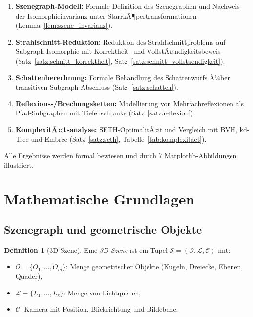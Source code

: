 ﻿\documentclass[a4paper,12pt]{article}
\theoremstyle{definition}
\newtheorem{definition}{Definition}[section]
\begin{document}
\begin{enumerate}
  \item \textbf{Szenegraph-Modell:} Formale Definition des Szenegraphen
        und Nachweis der Isomorphieinvarianz unter
        StarrkÃ¶pertransformationen
        (Lemma~\ref{lem:szene_invarianz}).
  \item \textbf{Strahlschnitt-Reduktion:} Reduktion des
        Strahlschnittproblems auf Subgraph-Isomorphie mit Korrektheit-
        und VollstÃ¤ndigkeitsbeweis
        (Satz~\ref{satz:schnitt_korrektheit},
        Satz~\ref{satz:schnitt_vollstaendigkeit}).
  \item \textbf{Schattenberechnung:} Formale Behandlung des
        Schattenwurfs Ã¼ber transitiven Subgraph-Abschluss
        (Satz~\ref{satz:schatten}).
  \item \textbf{Reflexions-/Brechungsketten:} Modellierung von
        Mehrfachreflexionen als Pfad-Subgraphen mit Tiefenschranke
        (Satz~\ref{satz:reflexion}).
  \item \textbf{KomplexitÃ¤tsanalyse:} SETH-OptimalitÃ¤t und Vergleich
        mit BVH, kd-Tree und Embree
        (Satz~\ref{satz:seth},
        Tabelle~\ref{tab:komplexitaet}).
\end{enumerate}

Alle Ergebnisse werden formal bewiesen und durch 7
Matplotlib-Abbildungen illustriert.

\section{Mathematische Grundlagen}

\subsection{Szenegraph und geometrische Objekte}

\begin{definition}[3D-Szene]
  \label{def:szene}
  Eine \emph{3D-Szene} ist ein Tupel
  $\mathcal{S} = (\mathcal{O}, \mathcal{L}, \mathcal{C})$ mit:
  \begin{itemize}
    \item $\mathcal{O} = \{O_1, \ldots, O_m\}$: Menge geometrischer
          Objekte (Kugeln, Dreiecke, Ebenen, Quader),
    \item $\mathcal{L} = \{L_1, \ldots, L_k\}$: Menge
          von Lichtquellen,
    \item $\mathcal{C}$: Kamera mit Position, Blickrichtung und
          Bildebene.
  \end{itemize}
\end{definition}
\end{document}
